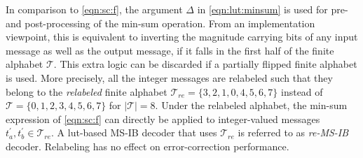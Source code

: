 In comparison to \eqref{eqn:sc:f}, the argument $\Delta$ in \eqref{eqn:lut:minsum} is used for pre- and post-processing of the min-sum operation. 
From an implementation viewpoint, this is equivalent to inverting the magnitude carrying bits of any input message as well as the output message, if it falls in the first half of the finite alphabet $\mathcal{T}$. This extra logic can be discarded if a partially flipped finite alphabet is used. 
More precisely, all the integer messages are relabeled such that they belong to the \emph{relabeled} finite alphabet $\mathcal{T}_{re} = \{3,2,1,0,4,5,6,7 \}$ instead of  $\mathcal{T} = \{0,1,2,3,4,5,6,7 \}$ for $|\mathcal{T}|=8$.
Under the relabeled alphabet, the min-sum expression of \eqref{eqn:sc:f} can directly be applied to integer-valued messages $t_a^\prime,t_b^\prime\in\mathcal{T}_{re}$. A \gls{lut}-based MS-IB decoder that  uses $\mathcal{T}_{re}$ is referred to as \emph{re-MS-IB} decoder. Relabeling has no effect on error-correction performance.



